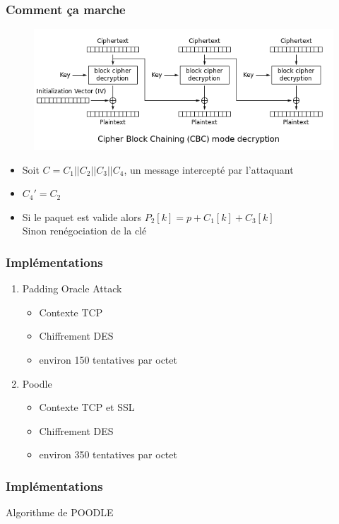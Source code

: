 \begin{frame}
  \frametitle{Comment ça marche}
  \begin{figure}[h]
    \centering
  \includegraphics[scale=0.3]{CBC_Decrypt}
  \end{figure}
    \begin{itemize}
  \item  Soit $C = C_1 || C_2 || C_3 || C_4$, un message intercepté par l'attaquant
    \pause
  \item $C_4'=C_2$
    \pause
  \item Si le paquet est valide alors $P_2[k] = p + C_1[k] + C_3[k]$ \\
    Sinon renégociation de la clé
  \end{itemize}
\end{frame}

\begin{frame}
  \frametitle{Implémentations}
  
  \begin{enumerate}
  \item Padding Oracle Attack
    \begin{itemize}
    \item Contexte TCP
    \item Chiffrement DES
    \item environ 150 tentatives par octet
    \end{itemize}
    \pause
  \item Poodle
    \begin{itemize}
    \item Contexte TCP et SSL
    \item Chiffrement DES
    \item environ 350 tentatives par octet
    \end{itemize}
  \end{enumerate}

\end{frame}


\begin{frame}
  \frametitle{Implémentations}
  \begin{block}{Algorithme de POODLE}
    
  \end{block}
\end{frame}


